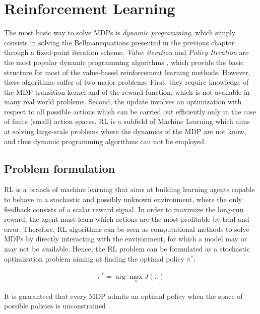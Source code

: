 \section{Reinforcement Learning}
The most basic way to solve \gls{MDP}s is \emph{dynamic programming}, which simply consists in solving the Bellmanequations presented in the previous chapter through a fixed-point iteration scheme. \emph{Value iteration} and \emph{Policy Iteration} are the most popular dynamic programming algorithms \cite{sutton2018reinforcement}, which provide the basic structure for most of the value-based reinforcement learning methods. However, these algorithms suffer of two major problems. First, they require knowledge of the \gls{MDP} transition kernel and of the reward function, which is not available in many real world problems. Second, the update involves an optimization with respect to all possible actions which can be carried out efficiently only in the case of finite (small) action spaces. 
\gls{RL} is a subfield of Machine Learning which aims at solving large-scale problems where the dynamics of the \gls{MDP} are not know, and thus dynamic programming algorithms can not be employed. 

\subsection{Problem formulation}
\gls{RL} is a branch of machine learning that aims at building learning agents capable to behave in a stochastic and possibly unknown environment, where the only feedback consists of a scalar reward signal. In order to maximize the long-run reward, the agent must learn which actions are the most profitable by trial-and-error. Therefore, \gls{RL} algorithms can be seen as computational methods to solve \gls{MDP}s by directly interacting with the environment, for which a model may or
may not be available. Hence, the \gls{RL} problem can be formulated as a stochastic optimization problem aiming at finding the optimal policy $\pi^{*}$:

\begin{align}
\pi^* = \arg \max_{\pi} J(\pi)
\end{align}

It is guaranteed that every \gls{MDP} admits an optimal policy when the space of possible policies is unconstrained  \cite{puterman2014markov}.

